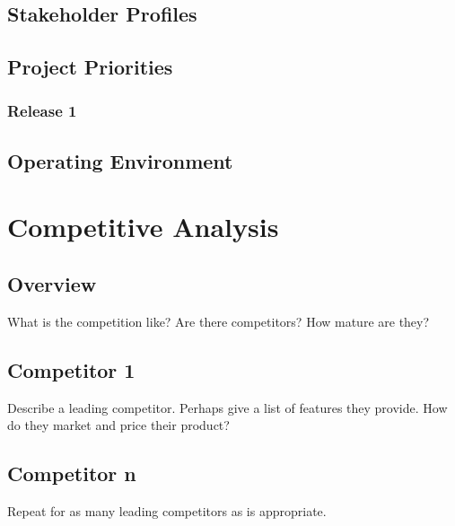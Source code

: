\documentclass[12pt,oneside,letterpaper]{article}
\begin{document}
\subsection{Stakeholder Profiles}
\subsection{Project Priorities}
\subsubsection{Release 1}
\subsection{Operating Environment}

\section{Competitive Analysis}
\subsection{Overview}
What is the competition like?  Are there competitors?  How mature are they?  
\subsection{Competitor 1}
Describe a leading competitor.  Perhaps give a list of features they provide.  How do they market and price their product?
\subsection{Competitor n}
Repeat for as many leading competitors as is appropriate.
\end{document}
